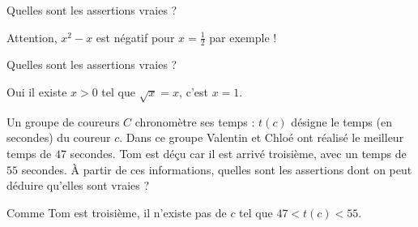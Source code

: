 \begin{question}
Quelles sont les assertions vraies ?
\begin{answers}    



\end{answers}
\begin{explanations}
Attention, $x^2-x$ est négatif pour $x=\frac12$ par exemple !
\end{explanations}
\end{question}


\begin{question}
Quelles sont les assertions vraies ?
\begin{answers}  


 
\end{answers}
\begin{explanations}
Oui il existe $x>0$ tel que $\sqrt{x} = x$, c'est $x=1$.
\end{explanations}
\end{question}


\begin{question}
Un groupe de coureurs $C$ chronomètre ses temps : $t(c)$ désigne le temps (en secondes) du coureur $c$.
Dans ce groupe Valentin et Chloé ont réalisé le meilleur temps de $47$ secondes. Tom est déçu car il est arrivé troisième, avec un temps de $55$ secondes.
À partir de ces informations, quelles sont les assertions dont on peut déduire qu'elles sont vraies ?
\begin{answers}



\end{answers}
\begin{explanations}
Comme Tom est troisième, il n'existe pas de $c$ tel que $47 < t(c) < 55$. 
\end{explanations}
\end{question}


